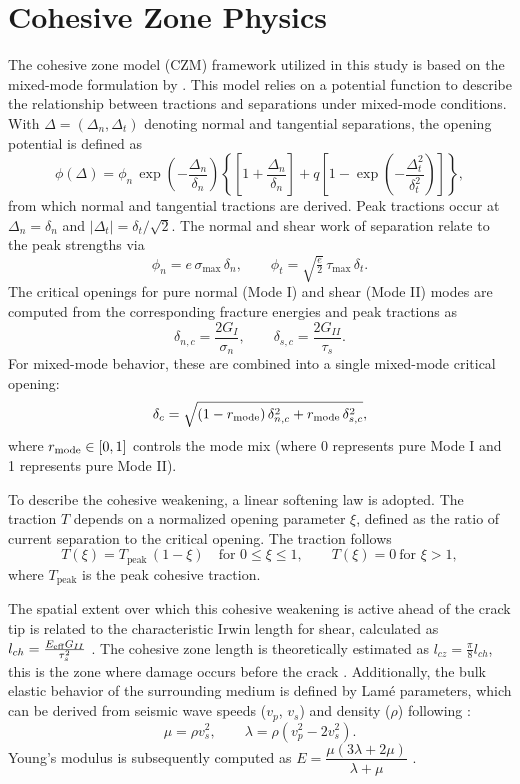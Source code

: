 \section{Cohesive Zone Physics}
\label{sec:czm_theory}

The cohesive zone model (CZM) framework utilized in this study is based on the mixed-mode formulation by \cite{mahajanModelingInterfacialCrack2008}. This model relies on a potential function to describe the relationship between tractions and separations under mixed-mode conditions. With $\Delta=(\Delta_n,\Delta_t)$ denoting normal and tangential separations, the opening potential is defined as
\[
\phi(\Delta)=\phi_n\,\exp\left(-\frac{\Delta_n}{\delta_n}\right)\left\{\left[1+\frac{\Delta_n}{\delta_n}\right]+q\left[1-\exp\left(-\frac{\Delta_t^2}{\delta_t^2}\right)\right]\right\},
\]
from which normal and tangential tractions are derived. Peak tractions occur at $\Delta_n=\delta_n$ and $|\Delta_t|=\delta_t/\sqrt{2}$. The normal and shear work of separation relate to the peak strengths via
\[
\phi_n = e\,\sigma_{\max}\,\delta_n, \qquad \phi_t = \sqrt{\tfrac{e}{2}}\,\tau_{\max}\,\delta_t.
\]
The critical openings for pure normal (Mode I) and shear (Mode II) modes are computed from the corresponding fracture energies and peak tractions as
\[
\delta_{n,c}=\frac{2G_I}{\sigma_n},\qquad \delta_{s,c}=\frac{2G_{II}}{\tau_s}.
\]
For mixed-mode behavior, these are combined into a single mixed-mode critical opening:
\[
\delta_c=\sqrt{(1-r_{\rm mode})\,\delta_{n,c}^2 + r_{\rm mode}\,\delta_{s,c}^2 },
\]
where $r_{\rm mode}\in[0,1]$ controls the mode mix (where 0 represents pure Mode I and 1 represents pure Mode II).\par

To describe the cohesive weakening, a linear softening law is adopted. The traction $T$ depends on a normalized opening parameter $\xi$, defined as the ratio of current separation to the critical opening. The traction follows
\[
T(\xi) = T_\mathrm{peak}\,(1-\xi) \quad\text{for } 0\leq\xi\leq1,\qquad T(\xi)=0\ \text{for }\xi>1,
\]
where $T_\mathrm{peak}$ is the peak cohesive traction.\par

The spatial extent over which this cohesive weakening is active ahead of the crack tip is related to the characteristic Irwin length for shear, calculated as $l_{ch}=\frac{E_{\rm eff}G_{II}}{\tau_s^2}$ \parencite{kirchnerFractureToughnessSnow2002}. The cohesive zone length is theoretically estimated as $l_{cz}=\tfrac{\pi}{8}l_{ch}$, this is the zone where damage occurs before the crack \parencite{mahajanModelingInterfacialCrack2008}. Additionally, the bulk elastic behavior of the surrounding medium is defined by Lamé parameters, which can be derived from seismic wave speeds ($v_p$, $v_s$) and density ($\rho$) following \cite{kAkiRichards19801981}:
\[
\mu=\rho v_s^2, \qquad \lambda=\rho(v_p^2-2v_s^2).
\]
Young's modulus is subsequently computed as $E=\dfrac{\mu(3\lambda+2\mu)}{\lambda+\mu}$ \parencite{kAkiRichards19801981}.

